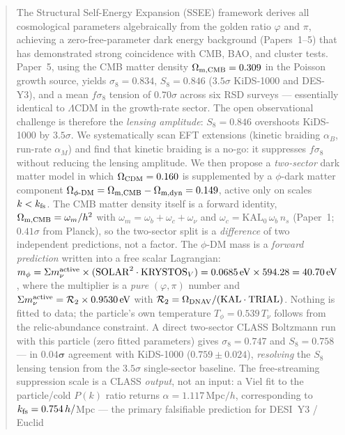 \documentclass[12pt,a4paper]{article}
\newcommand{\SSEE}{\textsc{SSEE}}
\newcommand{\phiDM}{\phi\text{-DM}}
\newcommand{\kfs}{k_{\rm fs}}
\newcommand{\mphi}{m_\phi}
\newcommand{\mnu}{\Sigma m_\nu}
\begin{document}
\begin{abstract}
The Structural Self-Energy Expansion (\SSEE) framework derives all cosmological
parameters algebraically from the golden ratio $\varphi$ and $\pi$, achieving a
zero-free-parameter dark energy background (Papers~1--5) that has demonstrated
strong coincidence with CMB, BAO, and cluster tests.
Paper~5, using the CMB matter density $\Omega_{\rm m,CMB}=0.309$ in the Poisson
growth source, yields $\sigma_8 = 0.834$, $S_8 = 0.846$ ($3.5\sigma$ KiDS-1000 and
DES-Y3), and a mean $f\sigma_8$ tension of $0.70\sigma$ across six RSD surveys ---
essentially identical to $\Lambda$CDM in the growth-rate sector.  The open observational
challenge is therefore the \emph{lensing amplitude}: $S_8 = 0.846$ overshoots
KiDS-1000 by $3.5\sigma$.
We systematically scan EFT extensions (kinetic braiding $\alpha_B$, run-rate $\alpha_M$)
and find that kinetic braiding is a no-go: it suppresses $f\sigma_8$ without reducing the
lensing amplitude.
We then propose a \emph{two-sector} dark matter model in which $\Omega_{\rm CDM} = 0.160$
is supplemented by a $\phi$-dark matter component
$\Omega_{\phiDM} = \Omega_{\rm m,CMB} - \Omega_{\rm m,dyn} = 0.149$, active only on scales $k < \kfs$.
The CMB matter density itself is a forward identity, $\Omega_{\rm m,CMB}=\omega_m/h^2$
with $\omega_m=\omega_b+\omega_c+\omega_\nu$ and $\omega_c=\mathrm{KAL}_0\,\omega_b\,n_s$
(Paper~1; $0.41\sigma$ from Planck), so the two-sector split is a \emph{difference}
of two independent predictions, not a factor.
The $\phi$-DM mass is a \emph{forward prediction} written into a free scalar
Lagrangian: $\mphi = \mnu^{\rm active}\times(\mathrm{SOLAR}^2\cdot\mathrm{KRYSTOS}_V)
= 0.0685\,\mathrm{eV}\times 594.28 = 40.70\,\mathrm{eV}$, where the multiplier is a
\emph{pure} $(\varphi,\pi)$ number and $\mnu^{\rm active}=\mathcal{R}_2\times0.9530\,\mathrm{eV}$
with $\mathcal{R}_2=\Omega_{\rm DNAV}/(\mathrm{KAL}\cdot\mathrm{TRIAL})$. Nothing is fitted
to data; the particle's own temperature $T_\phi = 0.539\,T_\nu$ follows from the
relic-abundance constraint. A direct two-sector CLASS Boltzmann run with this
particle (zero fitted parameters) gives $\sigma_8 = 0.747$ and
$S_8 = 0.758$ --- in $\mathbf{0.04\sigma}$ agreement with KiDS-1000 ($0.759\pm0.024$),
\emph{resolving} the $S_8$ lensing tension from the $3.5\sigma$ single-sector baseline.
The free-streaming suppression scale is a CLASS \emph{output}, not an input: a Viel
fit to the particle/cold $P(k)$ ratio returns $\alpha = 1.117\,$Mpc$/h$, corresponding
to $\kfs = 0.754\,h/$Mpc --- the primary falsifiable prediction for DESI~Y3 / Euclid

\end{abstract}
\end{document}
